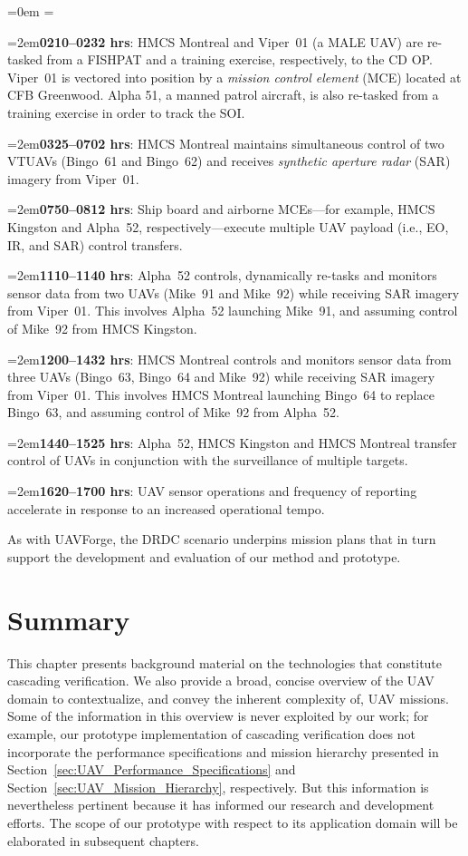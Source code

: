 {
\parindent=0em
\parskip=\medskipamount

\newcommand{\myindent}[1]{\hangindent=2em\textbf{#1}}

\myindent{0210--0232 hrs}: HMCS Montreal and Viper~01 (a MALE UAV) are re-tasked from a FISHPAT and a training exercise, respectively, to the CD OP\@. Viper~01 is vectored into position by a \emph{mission control element} (MCE) located at CFB Greenwood. Alpha 51, a manned patrol aircraft, is also re-tasked from a training exercise in order to track the SOI\@.

\myindent{0325--0702 hrs}: HMCS Montreal maintains simultaneous control of two VTUAVs (Bingo~61 and Bingo~62) and receives \emph{synthetic aperture radar} (SAR) imagery from Viper~01.

\myindent{0750--0812 hrs}: Ship board and airborne MCEs---for example, HMCS Kingston and Alpha~52, respectively---execute multiple UAV payload (i.e., EO, IR, and SAR) control transfers.

\myindent{1110--1140 hrs}: Alpha~52 controls, dynamically re-tasks and monitors sensor data from two UAVs (Mike~91 and Mike~92) while receiving SAR imagery from Viper~01. This involves Alpha~52 launching Mike~91, and assuming control of Mike~92 from HMCS Kingston.

\myindent{1200--1432 hrs}: HMCS Montreal controls and monitors sensor data from three UAVs (Bingo~63, Bingo~64 and Mike~92) while receiving SAR imagery from Viper~01. This involves HMCS Montreal launching Bingo~64 to replace Bingo~63, and assuming control of Mike~92 from Alpha~52.

\myindent{1440--1525 hrs}: Alpha~52, HMCS Kingston and HMCS Montreal transfer control of UAVs in conjunction with the surveillance of multiple targets.

\myindent{1620--1700 hrs}: UAV sensor operations and frequency of reporting accelerate in response to an increased operational tempo.

}

As with UAVForge, the DRDC scenario underpins mission plans that in turn support the development and evaluation of our method and prototype.

\section{Summary}
\label{sec:Background_Summary}

This chapter presents background material on the technologies that constitute cascading verification. We also provide a broad, concise overview of the UAV domain to contextualize, and convey the inherent complexity of, UAV missions. Some of the information in this overview is never exploited by our work; for example, our prototype implementation of cascading verification does not incorporate the performance specifications and mission hierarchy presented in Section~\ref{sec:UAV_Performance_Specifications} and Section~\ref{sec:UAV_Mission_Hierarchy}, respectively. But this information is nevertheless pertinent because it has informed our research and development efforts. The scope of our prototype with respect to its application domain will be elaborated in subsequent chapters.
